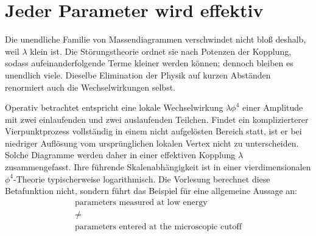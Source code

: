 \begin{classroomqa}\end{classroomqa}

\section{Jeder Parameter wird effektiv}

Die unendliche Familie von Massendiagrammen verschwindet nicht bloß deshalb, weil \(\lambda\) klein ist. Die Störungstheorie ordnet sie nach Potenzen der Kopplung, sodass aufeinanderfolgende Terme kleiner werden können; dennoch bleiben es unendlich viele. Dieselbe Elimination der Physik auf kurzen Abständen renormiert auch die Wechselwirkungen selbst.

\begin{classroomqa}\end{classroomqa}

Operativ betrachtet entspricht eine lokale Wechselwirkung \(\lambda\phi^4\) einer Amplitude mit zwei einlaufenden und zwei auslaufenden Teilchen. Findet ein komplizierterer Vierpunktprozess vollständig in einem nicht aufgelösten Bereich statt, ist er bei niedriger Auflösung vom ursprünglichen lokalen Vertex nicht zu unterscheiden. Solche Diagramme werden daher in einer effektiven Kopplung \(\lambda\) zusammengefasst. Ihre führende Skalenabhängigkeit ist in einer vierdimensionalen \(\phi^4\)-Theorie typischerweise logarithmisch. Die Vorlesung berechnet diese Betafunktion nicht, sondern führt das Beispiel für eine allgemeine Aussage an: \begin{equation}
\begin{gathered}
\text{parameters measured at low energy}\\
\ne\\
\text{parameters entered at the microscopic cutoff}
\end{gathered}
\end{equation}

